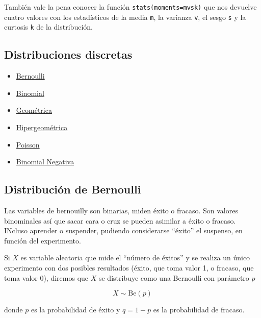 \documentclass[
]{article}
\providecommand{\tightlist}{%
  \setlength{\itemsep}{0pt}\setlength{\parskip}{0pt}}
\begin{document}
También vale la pena conocer la función
\texttt{stats(moments=\textquotesingle{}mvsk\textquotesingle{})} que nos
devuelve cuatro valores con los estadísticos de la media \texttt{m}, la
varianza \texttt{v}, el sesgo \texttt{s} y la curtosis \texttt{k} de la
distribución.

\hypertarget{distribuciones-discretas}{%
\subsection{Distribuciones discretas}\label{distribuciones-discretas}}

\begin{itemize}
\tightlist
\item
  \href{https://es.wikipedia.org/wiki/Distribución_de_Bernoulli}{Bernoulli}
\item
  \href{https://es.wikipedia.org/wiki/Distribución_binomial}{Binomial}
\item
  \href{https://es.wikipedia.org/wiki/Distribución_geométrica}{Geométrica}
\item
  \href{https://es.wikipedia.org/wiki/Distribución_hipergeométrica}{Hipergeométrica}
\item
  \href{https://es.wikipedia.org/wiki/Distribución_de_Poisson}{Poisson}
\item
  \href{https://es.wikipedia.org/wiki/Distribución_binomial_negativa}{Binomial
  Negativa}
\end{itemize}

\hypertarget{distribuciuxf3n-de-bernoulli}{%
\subsection{Distribución de
Bernoulli}\label{distribuciuxf3n-de-bernoulli}}

Las variables de bernouilly son binarias, miden éxito o fracaso. Son
valores binominales así que sacar cara o cruz se pueden asimilar a éxito
o fracaso. INcluso aprender o suspender, pudiendo considerarse ``éxito''
el suspenso, en función del experimento.

Si \(X\) es variable aleatoria que mide el ``número de éxitos'' y se
realiza un único experimento con dos posibles resultados (éxito, que
toma valor 1, o fracaso, que toma valor 0), diremos que \(X\) se
distribuye como una Bernoulli con parámetro \(p\)

\[X\sim \text{Be}(p)\]

donde \(p\) es la probabilidad de éxito y \(q = 1-p\) es la probabilidad
de fracaso.
\end{document}
